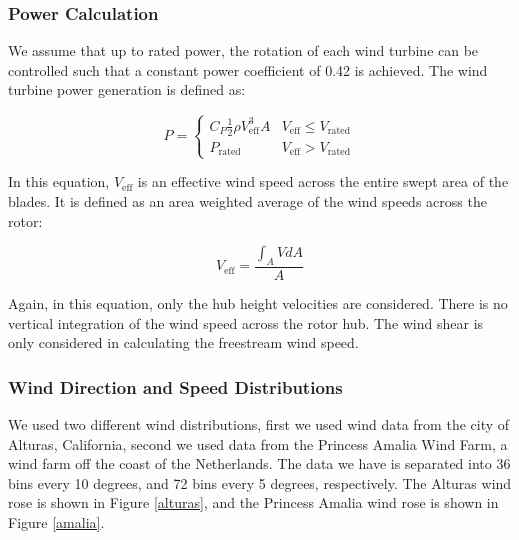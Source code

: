 \subsubsection{Power Calculation}
We assume that up to rated power, the rotation of each wind turbine can be controlled such that a constant power coefficient of 0.42 is achieved. The wind turbine power generation is defined as:

\begin{equation}
P = 
\begin{cases} 
      C_P\frac{1}{2}\rho V_{\text{eff}}^3A & V_{\text{eff}}\leq V_{\text{rated}} \\
      P_{\text{rated}} & V_{\text{eff}} > V_{\text{rated}}
   \end{cases}
\end{equation}

\noindent In this equation, $V_{\text{eff}}$ is an effective wind speed across the entire swept area of the blades. It is defined as an area weighted average of the wind speeds across the rotor:

\begin{equation}
V_{\text{eff}} = \frac{\int_A V dA }{A}
\end{equation}

\noindent Again, in this equation, only the hub height velocities are considered. There is no vertical integration of the wind speed across the rotor hub. The wind shear is only considered in calculating the freestream wind speed.


\subsubsection{Wind Direction and Speed Distributions}

We used two different wind distributions, first we used wind data from the city of Alturas, California, second we used data from the Princess Amalia Wind Farm, a wind farm off the coast of the Netherlands. 
The data we have is separated into 36 bins every 10 degrees, and 72 bins every 5 degrees, respectively. The Alturas wind rose is shown in Figure \ref{alturas}, and the Princess Amalia wind rose is shown in Figure \ref{amalia}. 

